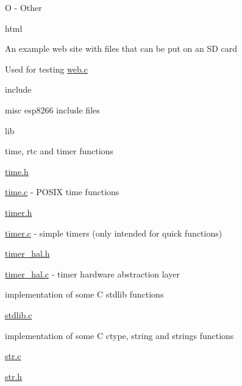 \begin{DoxyItemize}
\begin{DoxyItemize}
\begin{DoxyItemize}
\begin{DoxyItemize}
\begin{DoxyItemize}
\item O -\/ Other
\end{DoxyItemize}
\end{DoxyItemize}
\end{DoxyItemize}
\end{DoxyItemize}
\item html
\begin{DoxyItemize}
\item An example web site with files that can be put on an SD card
\item Used for testing \hyperlink{web_8c}{web.\+c}
\end{DoxyItemize}
\item include
\begin{DoxyItemize}
\item misc esp8266 include files
\end{DoxyItemize}
\item lib
\begin{DoxyItemize}
\item time, rtc and timer functions
\begin{DoxyItemize}
\item \hyperlink{time_8h}{time.\+h}
\item \hyperlink{time_8c}{time.\+c} -\/ P\+O\+S\+IX time functions
\item \hyperlink{timer_8h}{timer.\+h}
\item \hyperlink{timer_8c}{timer.\+c} -\/ simple timers (only intended for quick functions)
\item \hyperlink{timer__hal_8h}{timer\+\_\+hal.\+h}
\item \hyperlink{timer__hal_8c}{timer\+\_\+hal.\+c} -\/ timer hardware abstraction layer
\end{DoxyItemize}
\item implementation of some C stdlib functions
\begin{DoxyItemize}
\item \hyperlink{stdlib_8c}{stdlib.\+c}
\end{DoxyItemize}
\item implementation of some C ctype, string and strings functions
\begin{DoxyItemize}
\item \hyperlink{str_8c}{str.\+c}
\item \hyperlink{str_8h}{str.\+h}
\end{DoxyItemize}
\end{DoxyItemize}
\end{DoxyItemize}

